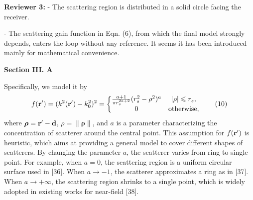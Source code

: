 \documentclass[a4paper,12pt]{article}
\begin{document}
\textbf{Reviewer 3:}
-   The scattering region is distributed in a solid circle facing the receiver.

-   The scattering gain function in Eqn. (6), from which the final model strongly depends, enters the loop without any reference. It seems it has been introduced mainly for mathematical convenience.

{}

\begin{framed}
	{\bf Section III. A}

    Specifically, we model it by 
	\begin{equation}
		f({\bf r}') = (k^2({\bf r}')-k_0^2)^2  =\left\{\begin{matrix}
		\frac{a+1}{\pi r_s^{2a+2}} (r_s^2-\rho^2)^{a}	&\left| \rho \right|\leqslant r_s, \\ 
		0	& {\rm otherwise},
		\end{matrix}\right.
		\tag{10}
	\end{equation}
where $\boldsymbol{\rho} = {\bf r}' - {\bf d}$, $\rho = \|\boldsymbol{\rho}\|$, and $a$ is a parameter characterizing the concentration of scatterer around the central point. {\color{red} This assumption for $f({\bf r}')$ is heuristic, which aims at providing a general model to cover different shapes of scatterers. By changing the parameter $a$, the scatterer varies from ring to single point.
For example, when $a = 0$, the scattering region is a uniform circular surface used in [36]. When $a \rightarrow -1$, the scatterer approximates a ring as in [37]. When $a \rightarrow +\infty$, the scattering region shrinks to a single point, which is widely adopted in existing works for near-field [38].}
\end{framed}
\end{document}
